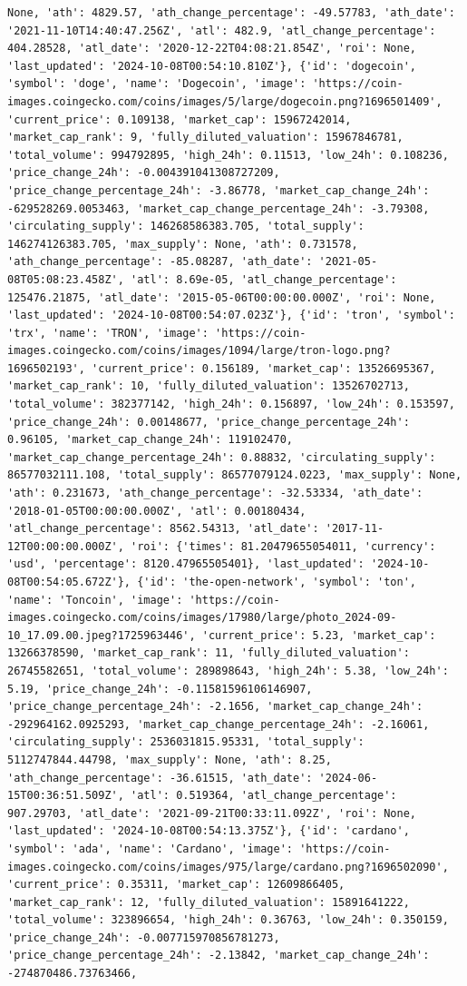 \documentclass[
  letterpaper,
  DIV=11,
  numbers=noendperiod]{scrreprt}
\begin{document}
\begin{verbatim}
None, 'ath': 4829.57, 'ath_change_percentage': -49.57783, 'ath_date': '2021-11-10T14:40:47.256Z', 'atl': 482.9, 'atl_change_percentage': 404.28528, 'atl_date': '2020-12-22T04:08:21.854Z', 'roi': None, 'last_updated': '2024-10-08T00:54:10.810Z'}, {'id': 'dogecoin', 'symbol': 'doge', 'name': 'Dogecoin', 'image': 'https://coin-images.coingecko.com/coins/images/5/large/dogecoin.png?1696501409', 'current_price': 0.109138, 'market_cap': 15967242014, 'market_cap_rank': 9, 'fully_diluted_valuation': 15967846781, 'total_volume': 994792895, 'high_24h': 0.11513, 'low_24h': 0.108236, 'price_change_24h': -0.004391041308727209, 'price_change_percentage_24h': -3.86778, 'market_cap_change_24h': -629528269.0053463, 'market_cap_change_percentage_24h': -3.79308, 'circulating_supply': 146268586383.705, 'total_supply': 146274126383.705, 'max_supply': None, 'ath': 0.731578, 'ath_change_percentage': -85.08287, 'ath_date': '2021-05-08T05:08:23.458Z', 'atl': 8.69e-05, 'atl_change_percentage': 125476.21875, 'atl_date': '2015-05-06T00:00:00.000Z', 'roi': None, 'last_updated': '2024-10-08T00:54:07.023Z'}, {'id': 'tron', 'symbol': 'trx', 'name': 'TRON', 'image': 'https://coin-images.coingecko.com/coins/images/1094/large/tron-logo.png?1696502193', 'current_price': 0.156189, 'market_cap': 13526695367, 'market_cap_rank': 10, 'fully_diluted_valuation': 13526702713, 'total_volume': 382377142, 'high_24h': 0.156897, 'low_24h': 0.153597, 'price_change_24h': 0.00148677, 'price_change_percentage_24h': 0.96105, 'market_cap_change_24h': 119102470, 'market_cap_change_percentage_24h': 0.88832, 'circulating_supply': 86577032111.108, 'total_supply': 86577079124.0223, 'max_supply': None, 'ath': 0.231673, 'ath_change_percentage': -32.53334, 'ath_date': '2018-01-05T00:00:00.000Z', 'atl': 0.00180434, 'atl_change_percentage': 8562.54313, 'atl_date': '2017-11-12T00:00:00.000Z', 'roi': {'times': 81.20479655054011, 'currency': 'usd', 'percentage': 8120.47965505401}, 'last_updated': '2024-10-08T00:54:05.672Z'}, {'id': 'the-open-network', 'symbol': 'ton', 'name': 'Toncoin', 'image': 'https://coin-images.coingecko.com/coins/images/17980/large/photo_2024-09-10_17.09.00.jpeg?1725963446', 'current_price': 5.23, 'market_cap': 13266378590, 'market_cap_rank': 11, 'fully_diluted_valuation': 26745582651, 'total_volume': 289898643, 'high_24h': 5.38, 'low_24h': 5.19, 'price_change_24h': -0.11581596106146907, 'price_change_percentage_24h': -2.1656, 'market_cap_change_24h': -292964162.0925293, 'market_cap_change_percentage_24h': -2.16061, 'circulating_supply': 2536031815.95331, 'total_supply': 5112747844.44798, 'max_supply': None, 'ath': 8.25, 'ath_change_percentage': -36.61515, 'ath_date': '2024-06-15T00:36:51.509Z', 'atl': 0.519364, 'atl_change_percentage': 907.29703, 'atl_date': '2021-09-21T00:33:11.092Z', 'roi': None, 'last_updated': '2024-10-08T00:54:13.375Z'}, {'id': 'cardano', 'symbol': 'ada', 'name': 'Cardano', 'image': 'https://coin-images.coingecko.com/coins/images/975/large/cardano.png?1696502090', 'current_price': 0.35311, 'market_cap': 12609866405, 'market_cap_rank': 12, 'fully_diluted_valuation': 15891641222, 'total_volume': 323896654, 'high_24h': 0.36763, 'low_24h': 0.350159, 'price_change_24h': -0.007715970856781273, 'price_change_percentage_24h': -2.13842, 'market_cap_change_24h': -274870486.73763466, 
\end{verbatim}
\end{document}
